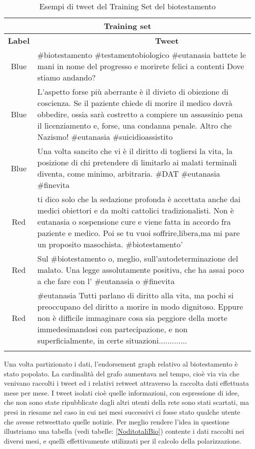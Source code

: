 \begin{longtable}[c]{|c|p{10cm}|}

 \hline
 \multicolumn{2}{|c|}{\textbf{Training set}} \\
 \hline 
 
 \textbf{Label} & \ \ \ \ \ \ \ \ \ \ \ \ \ \ \ \ \ \ \ \ \ \ \ \ \ \ \ \ \ \ \textbf{Tweet}\\
 \hline
 Blue   & \#biotestamento \#testamentobiologico \#eutanasia battete le mani in nome del progresso e morirete felici a contenti Dove stiamo andando?\\ \hline
 Blue & L'aspetto forse più aberrante è il divieto di obiezione di coscienza. Se il paziente chiede di morire il medico dovrà obbedire, ossia sarà costretto a compiere un assassinio pena il licenziamento e, forse, una condanna penale. Altro che Nazismo! \#eutanasia \#suicidioassistito \\ \hline
 Blue & Una volta sancito che vi è il diritto di togliersi la vita, la posizione di chi pretendere di limitarlo ai malati terminali diventa, come minimo, arbitraria. \#DAT \#eutanasia \#finevita \\ \hline 
 Red & ti dico solo che la sedazione profonda è accettata anche dai medici obiettori e da molti cattolici tradizionalisti. Non è eutanasia o sospensione cure e viene fatta in accordo fra paziente e medico. Poi se tu vuoi soffrire,libera,ma mi pare un proposito masochista. \#biotestamento'  \\ \hline
Red & Sul \#biotestamento o, meglio, sull'autodeterminazione del malato. Una legge assolutamente positiva, che ha assai poco a che fare con l' \#eutanasia o \#finevita \\ \hline
Red & \#eutanasia Tutti parlano di diritto alla vita, ma pochi si preoccupano del diritto a morire in modo dignitoso. Eppure non è difficile immaginare cosa sia peggiore della morte immedesimandosi con partecipazione, e non superficialmente, in certe situazioni.............\\
 \hline
\caption{Esempi di tweet del Training Set del biotestamento}
 \label{trainingSetExampleBio}
\end{longtable}

Una volta partizionato i dati, l'endorsement graph relativo al biotestamento è stato popolato. La cardinalità del grafo aumentava nel tempo, cioè via via che venivano raccolti i tweet ed i relativi retweet attraverso la raccolta dati effettuata mese per mese. I tweet isolati cioè quelle informazioni, con espressione di idee, che non sono state ripubblicate dagli altri utenti della rete sono stati scartati, ma presi in riesame nel caso in cui nei mesi successivi ci fosse stato qualche utente che avesse retweettato quelle notizie.
Per meglio rendere l'idea in questione illustriamo una tabella (vedi tabelle: \ref{NoditotaliBio}) contente i dati raccolti nei diversi mesi, e quelli effettivamente utilizzati per il calcolo della polarizzazione.

